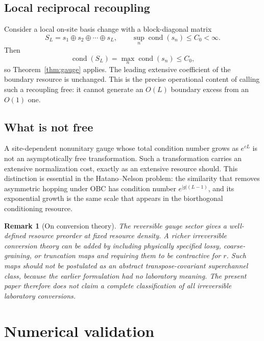 \documentclass[reprint,amsmath,amssymb,aps,nofootinbib]{revtex4-2}
\newtheorem{remark}{Remark}
\newcommand{\cond}{\operatorname{cond}}
\begin{document}
\subsection{Local reciprocal recoupling}
Consider a local on-site basis change with a block-diagonal matrix
\begin{equation}
S_L=s_1\oplus s_2\oplus\cdots\oplus s_L,
\qquad
\sup_n\cond(s_n)\le C_0<\infty.
\end{equation}
Then
\begin{equation}
\cond(S_L)=\max_n\cond(s_n)\le C_0,
\end{equation}
so Theorem~\ref{thm:gauge} applies. The leading extensive coefficient of the
boundary resource is unchanged. This is the precise operational content of
calling such a recoupling free: it cannot generate an $O(L)$ boundary excess
from an $O(1)$ one.

\subsection{What is not free}
A site-dependent nonunitary gauge whose total condition number grows as
$e^{cL}$ is not an asymptotically free transformation. Such a transformation
carries an extensive normalization cost, exactly as an extensive resource
should. This distinction is essential in the Hatano--Nelson problem: the
similarity that removes asymmetric hopping under OBC has condition number
$e^{|g|(L-1)}$, and its exponential growth is the same scale that appears in
the biorthogonal conditioning resource.

\begin{remark}[On conversion theory]
The reversible gauge sector gives a well-defined resource preorder at fixed
resource density. A richer irreversible conversion theory can be added by
including physically specified lossy, coarse-graining, or truncation maps and
requiring them to be contractive for $r$. Such maps should not be postulated as
an abstract transpose-covariant superchannel class, because the earlier
formulation had no laboratory meaning. The present paper therefore does not
claim a complete classification of all irreversible laboratory conversions.
\end{remark}

\section{Numerical validation}
\label{sec:numerics}
\end{document}
